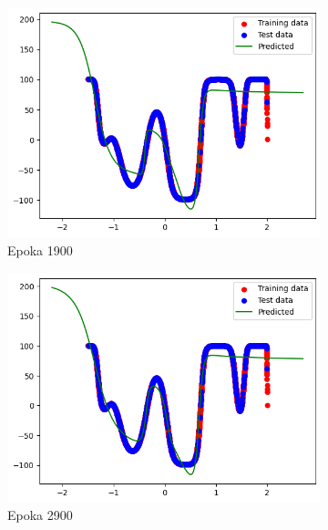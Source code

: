 \documentclass{article}
\begin{document}
\begin{figure}[H]
    \centering
    \begin{subfigure}{0.32\textwidth}
        \includegraphics[width=\linewidth]{img/ae3/mml7.png}
        \caption{Epoka 1900}
    \end{subfigure}
    \hfill
    \begin{subfigure}{0.32\textwidth}
        \includegraphics[width=\linewidth]{img/ae3/mml8.png}
        \caption{Epoka 2900}
    \end{subfigure}
    \hfill
    \begin{subfigure}{0.32\textwidth}

\end{subfigure}
\end{figure}
\end{document}
